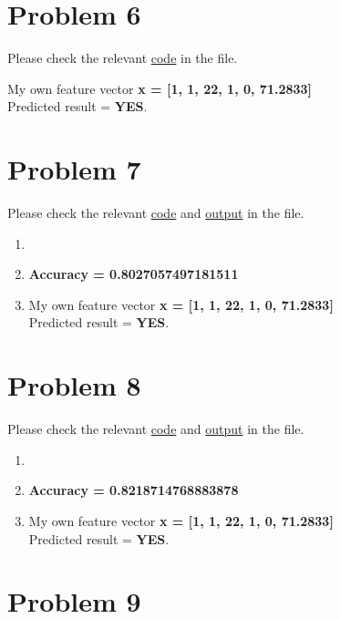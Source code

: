 \documentclass{article}
\begin{document}
\section*{Problem 6}
    \begin{center}
        Please check the relevant \href{https://github.com/z-zijie/2020Fall/blob/master/COMP760/Homework4/code.py}{code} in the file.
    \end{center}
    My own feature vector \textbf{x = [1, 1, 22, 1, 0, 71.2833]}\\
    Predicted result = \textbf{YES}.

    \section*{Problem 7}
    \begin{center}
        Please check the relevant \href{https://github.com/z-zijie/2020Fall/blob/master/COMP760/Homework4/code.py}{code} and \href{https://github.com/z-zijie/2020Fall/blob/master/COMP760/Homework4/P7.txt}{output} in the file.
    \end{center}
    \begin{enumerate}
        \item 
        \item \textbf{Accuracy = 0.8027057497181511}
        \item My own feature vector \textbf{x = [1, 1, 22, 1, 0, 71.2833]}\\
        Predicted result = \textbf{YES}.
    \end{enumerate}

\section*{Problem 8}
    \begin{center}
        Please check the relevant \href{https://github.com/z-zijie/2020Fall/blob/master/COMP760/Homework4/code.py}{code} and \href{https://github.com/z-zijie/2020Fall/blob/master/COMP760/Homework4/P8.txt}{output} in the file.
    \end{center}
    \begin{enumerate}
        \item 
        \item \textbf{Accuracy = 0.8218714768883878}
        \item My own feature vector \textbf{x = [1, 1, 22, 1, 0, 71.2833]}\\
        Predicted result = \textbf{YES}.
    \end{enumerate}

\section*{Problem 9}
\end{document}
